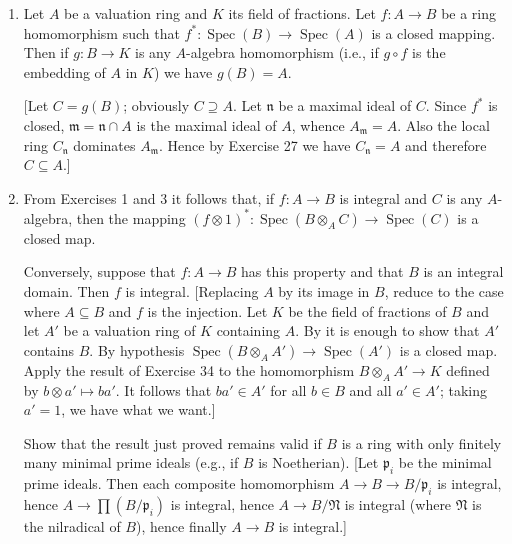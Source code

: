 \begin{enumerate}
Let $K$ be the field of fractions of $A$. Show that $v_0$ can be uniquely extended to a valuation $v$ of $K$, and that the value group of $v$ is precisely $\Gamma$.

\item Let $A$ be a valuation ring and $K$ its field of fractions. Let $f:A\longrightarrow B$ be a ring homomorphism such that $f^*:\operatorname{Spec}(B)\longrightarrow\operatorname{Spec}(A)$ is a closed mapping. Then if $g:B\longrightarrow K$ is any $A$-algebra homomorphism (i.e., if $g\circ f$ is the embedding of $A$ in $K$) we have $g(B)=A$.

[Let $C=g(B)$; obviously $C\supseteq A$. Let $\mathfrak n$ be a maximal ideal of $C$. Since $f^*$ is closed, $\mathfrak m=\mathfrak n\cap A$ is the maximal ideal of $A$, whence $A_{\mathfrak m}=A$. Also the local ring $C_{\mathfrak n}$ dominates $A_{\mathfrak m}$. Hence by Exercise 27 we have $C_{\mathfrak n}=A$ and therefore $C\subseteq A$.]

\item From Exercises 1 and 3 it follows that, if $f:A\longrightarrow B$ is integral and $C$ is any $A$-algebra, then the mapping $(f\otimes1)^*:\operatorname{Spec}(B\otimes_A C)\longrightarrow\operatorname{Spec}(C)$ is a closed map.

Conversely, suppose that $f:A\longrightarrow B$ has this property and that $B$ is an integral domain. Then $f$ is integral. [Replacing $A$ by its image in $B$, reduce to the case where $A\subseteq B$ and $f$ is the injection. Let $K$ be the field of fractions of $B$ and let $A'$ be a valuation ring of $K$ containing $A$. By  it is enough to show that $A'$ contains $B$. By hypothesis $\operatorname{Spec}(B\otimes_A A')\longrightarrow\operatorname{Spec}(A')$ is a closed map. Apply the result of Exercise 34 to the homomorphism $B\otimes_A A'\longrightarrow K$ defined by $b\otimes a'\mapsto ba'$. It follows that $ba'\in A'$ for all $b\in B$ and all $a'\in A'$; taking $a'=1$, we have what we want.]

Show that the result just proved remains valid if $B$ is a ring with only finitely many minimal prime ideals (e.g., if $B$ is Noetherian). [Let $\mathfrak p_i$ be the minimal prime ideals. Then each composite homomorphism $A\longrightarrow B\longrightarrow B/\mathfrak p_i$ is integral, hence $A\longrightarrow\prod(B/\mathfrak p_i)$ is integral, hence $A\longrightarrow B/\mathfrak N$ is integral (where $\mathfrak N$ is the nilradical of $B$), hence finally $A\longrightarrow B$ is integral.]
\end{enumerate}

